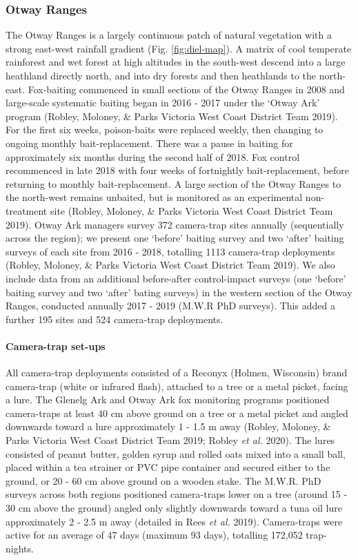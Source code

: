 \documentclass[]{elsarticle} %
\begin{document}
\hypertarget{otway-ranges}{%
\subsubsection{Otway Ranges}\label{otway-ranges}}

The Otway Ranges is a largely continuous patch of natural vegetation with a strong east-west rainfall gradient (Fig. \ref{fig:diel-map}). A matrix of cool temperate rainforest and wet forest at high altitudes in the south-west descend into a large heathland directly north, and into dry forests and then heathlands to the north-east. Fox-baiting commenced in small sections of the Otway Ranges in 2008 and large-scale systematic baiting began in 2016 - 2017 under the `Otway Ark' program (Robley, Moloney, \& Parks Victoria West Coast District Team 2019). For the first six weeks, poison-baits were replaced weekly, then changing to ongoing monthly bait-replacement. There was a pause in baiting for approximately six months during the second half of 2018. Fox control recommenced in late 2018 with four weeks of fortnightly bait-replacement, before returning to monthly bait-replacement. A large section of the Otway Ranges to the north-west remains unbaited, but is monitored as an experimental non-treatment site (Robley, Moloney, \& Parks Victoria West Coast District Team 2019). Otway Ark managers survey 372 camera-trap sites annually (sequentially across the region); we present one `before' baiting survey and two `after' baiting surveys of each site from 2016 - 2018, totalling 1113 camera-trap deployments (Robley, Moloney, \& Parks Victoria West Coast District Team 2019). We also include data from an additional before-after control-impact surveys (one `before' baiting survey and two `after' bating surveys) in the western section of the Otway Ranges, conducted annually 2017 - 2019 (M.W.R PhD surveys). This added a further 195 sites and 524 camera-trap deployments.

\hypertarget{camera-trap-set-ups}{%
\paragraph{Camera-trap set-ups}\label{camera-trap-set-ups}}

All camera-trap deployments consisted of a Reconyx (Holmen, Wisconsin) brand camera-trap (white or infrared flash), attached to a tree or a metal picket, facing a lure. The Glenelg Ark and Otway Ark fox monitoring programs positioned camera-traps at least 40 cm above ground on a tree or a metal picket and angled downwards toward a lure approximately 1 - 1.5 m away (Robley, Moloney, \& Parks Victoria West Coast District Team 2019; Robley \emph{et al.} 2020). The lures consisted of peanut butter, golden syrup and rolled oats mixed into a small ball, placed within a tea strainer or PVC pipe container and secured either to the ground, or 20 - 60 cm above ground on a wooden stake. The M.W.R. PhD surveys across both regions positioned camera-traps lower on a tree (around 15 - 30 cm above the ground) angled only slightly downwards toward a tuna oil lure approximately 2 - 2.5 m away (detailed in Rees \emph{et al.} 2019). Camera-traps were active for an average of 47 days (maximum 93 days), totalling 172,052 trap-nights.
\end{document}
